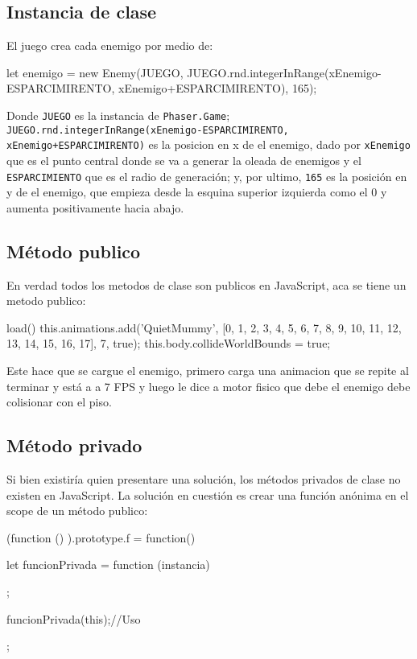 \documentclass{article}
\newcommand{\insertverbbox}{{\addvbuffer[6pt 3pt]{\theverbbox}\par}}
\begin{document}
    \subsection*{Instancia de clase}
    El juego crea cada enemigo por medio de:
    
    \begin{verbbox}
		let enemigo = new Enemy(JUEGO, 
		        JUEGO.rnd.integerInRange(xEnemigo-ESPARCIMIRENTO, xEnemigo+ESPARCIMIRENTO),
		        165);       
    \end{verbbox}
    \insertverbbox
	
	Donde \verb|JUEGO| es la instancia de \verb|Phaser.Game|; \verb|JUEGO.rnd.integerInRange(xEnemigo-ESPARCIMIRENTO, xEnemigo+ESPARCIMIRENTO)| es la posicion en x de el enemigo, dado por \verb|xEnemigo| que es el punto central donde se va a generar la oleada de enemigos y el \verb|ESPARCIMIENTO| que es el radio de generación; y, por ultimo, \verb|165| es la posición en y de el enemigo, que empieza desde la esquina superior izquierda como el 0 y aumenta positivamente hacia abajo.
	
    \subsection*{Método publico}
	En verdad todos los metodos de clase son publicos en JavaScript, aca se tiene un metodo publico:
	
	\begin{verbbox}
		load() {
		    this.animations.add('QuietMummy', [0, 1, 2, 3, 4, 5, 6, 7, 8, 9, 10, 11, 12, 13, 14, 15, 16, 17], 7, true);
		    this.body.collideWorldBounds = true;
		}
	\end{verbbox}
	\insertverbbox
     
    Este hace que se cargue el enemigo, primero carga una animacion que se repite al terminar y está a a 7 FPS y luego le dice a motor fisico que debe el enemigo debe colisionar con el piso.
    
   	\subsection*{Método privado}
   	Si bien existiría quien presentare una solución, los métodos privados de clase no existen en JavaScript. La solución en cuestión es crear una función anónima en el  scope de un método publico:
   	
   	\begin{verbbox}
		(function () {}).prototype.f = function() {
		    let funcionPrivada = function (instancia) {
		        
		    };
		    
		    funcionPrivada(this);//Uso
		};
   	\end{verbbox}
   	\insertverbbox
   	
\end{document}
